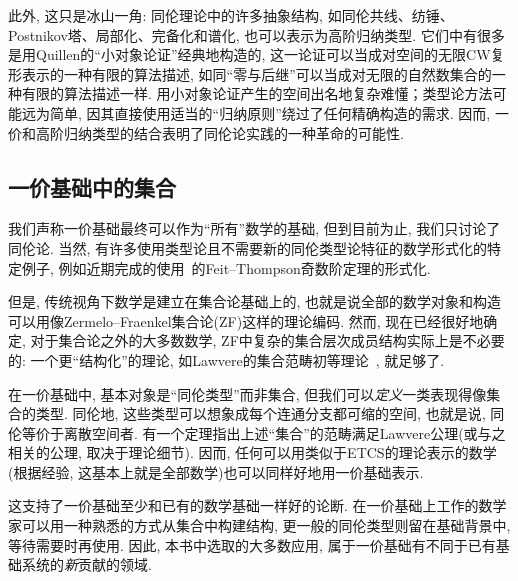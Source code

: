 此外, 这只是冰山一角: 同伦理论中的许多抽象结构, 如同伦共线、纺锤、Postnikov塔、局部化、完备化和谱化, 也可以表示为高阶归纳类型. 
它们中有很多是用Quillen的``小对象论证''经典地构造的, 这一论证可以当成对空间的无限CW复形表示的一种有限的算法描述, 如同``零与后继''可以当成对无限的自然数集合的一种有限的算法描述一样. 
用小对象论证产生的空间出名地复杂难懂；类型论方法可能远为简单, 因其直接使用适当的``归纳原则''绕过了任何精确构造的需求. 
因而, 一价和高阶归纳类型的结合表明了同伦论实践的一种革命的可能性. 


\subsection*{一价基础中的集合}

%

我们声称一价基础最终可以作为``所有''数学的基础, 但到目前为止, 我们只讨论了同伦论.  当然, 有许多使用类型论且不需要新的同伦类型论特征的数学形式化的特定例子, 
%
%
%
%
%
例如近期完成的使用\Coq~\cite{gonthier}的Feit--Thompson奇数阶定理的形式化. 

但是, 传统视角下数学是建立在集合论基础上的, 也就是说全部的数学对象和构造可以用像Zermelo--Fraenkel集合论(ZF)这样的理论编码. 
%
%
%
%
然而, 现在已经很好地确定, 对于集合论之外的大多数数学, ZF中复杂的集合层次成员结构实际上是不必要的: 一个更``结构化''的理论, 如Lawvere的集合范畴初等理论~\cite{lawvere:etcs-long}, 就足够了. 
%

在一价基础中, 基本对象是``同伦类型''而非集合, 但我们可以\emph{定义}一类表现得像集合的类型. 
同伦地, 这些类型可以想象成每个连通分支都可缩的空间, 也就是说, 同伦等价于离散空间者. 
%
有一个定理指出上述``集合''的范畴满足Lawvere公理(或与之相关的公理, 取决于理论细节). 
因而, 任何可以用类似于ETCS的理论表示的数学(根据经验, 这基本上就是全部数学)也可以同样好地用一价基础表示. 

这支持了一价基础至少和已有的数学基础一样好的论断. 
在一价基础上工作的数学家可以用一种熟悉的方式从集合中构建结构, 更一般的同伦类型则留在基础背景中, 等待需要时再使用. 
因此, 本书中选取的大多数应用, 属于一价基础有不同于已有基础系统的\emph{新}贡献的领域. 

